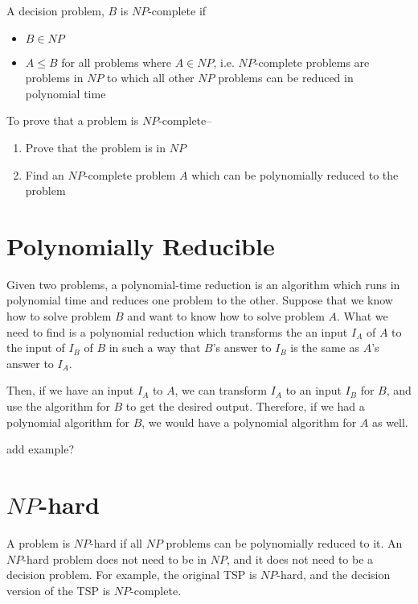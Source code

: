 \begin{definition*}{}{}
  A decision problem, $B$ is $NP$-complete if
  \begin{itemize}
    \item $B \in NP$
    \item $A \leq B$ for all problems where $A \in NP$, i.e. $NP$-complete problems are problems in $NP$ to which all
     other $NP$ problems can be reduced in polynomial time
  \end{itemize}

  To prove that a problem is $NP$-complete--
  \begin{enumerate}
    \item Prove that the problem is in $NP$
    \item Find an $NP$-complete problem $A$ which can be polynomially reduced to the problem
  \end{enumerate}
\end{definition*}

\section*{Polynomially Reducible}

Given two problems, a polynomial-time reduction is an algorithm which runs in polynomial time and reduces one problem
 to the other. Suppose that we know how to solve problem $B$ and want to know how to solve problem $A$. What we need to
 find is a polynomial reduction which transforms the an input $I_A$ of $A$ to the input of $I_B$ of $B$ in such a way
 that $B$'s answer to $I_B$ is the same as $A$'s answer to $I_A$.

Then, if we have an input $I_A$ to $A$, we can transform $I_A$ to an input $I_B$ for $B$, and use the algorithm for $B$
 to get the desired output. Therefore, if we had a polynomial algorithm for $B$, we would have a polynomial algorithm
 for $A$ as well.

{\Huge add example?}

\section*{$NP$-hard}

A problem is $NP$-hard if all $NP$ problems can be polynomially reduced to it. An $NP$-hard problem does not need to be
 in $NP$, and it does not need to be a decision problem. For example, the original TSP is $NP$-hard, and the decision
 version of the TSP is $NP$-complete.



